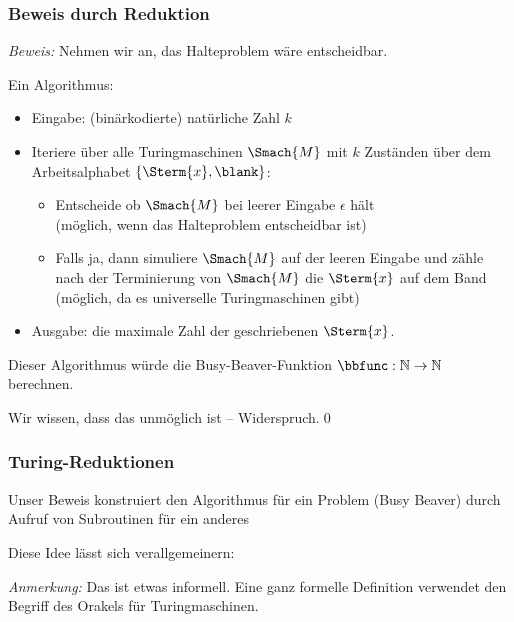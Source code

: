 \documentclass[aspectratio=1610,onlymath]{beamer}
\begin{document}
\begin{frame}[t]\frametitle{Beweis durch Reduktion\phantom{"`T"'}}

\pause

\emph{Beweis:} Nehmen wir an, das Halteproblem wäre entscheidbar.\medskip\pause

Ein Algorithmus:
\begin{itemize}
\item Eingabe: (binärkodierte) natürliche Zahl $k$
\item Iteriere über alle Turingmaschinen $\Smach{M}$ mit $k$ Zuständen über dem Arbeitsalphabet $\{\Sterm{x},\blank\}$:
\begin{itemize}
\item Entscheide ob $\Smach{M}$ bei leerer Eingabe $\epsilon$ hält\\
{\footnotesize\textcolor{devilscss}{(möglich, wenn das Halteproblem entscheidbar ist)}}
\item Falls ja, dann simuliere $\Smach{M}$ auf der leeren Eingabe und zähle
		nach der Terminierung von $\Smach{M}$ die $\Sterm{x}$ auf dem Band\\
{\footnotesize\textcolor{devilscss}{(möglich, da es universelle Turingmaschinen gibt)}}
\end{itemize}
\item Ausgabe: die maximale Zahl der geschriebenen $\Sterm{x}$.
\end{itemize}\pause
Dieser Algorithmus würde die Busy-Beaver-Funktion $\bbfunc:\mathbb{N}\to\mathbb{N}$
berechnen.\medskip

Wir wissen, dass das unmöglich ist -- Widerspruch.\qed

\end{frame}

\begin{frame}\frametitle{Turing-Reduktionen}

Unser Beweis konstruiert den Algorithmus für ein Problem (Busy Beaver)
durch Aufruf von Subroutinen für ein anderes 
\bigskip\pause

Diese Idee lässt sich verallgemeinern:


{\footnotesize
\emph{Anmerkung:} Das ist etwas informell. Eine ganz formelle Definition verwendet den Begriff des \alert{Orakels} für Turingmaschinen.
}\medskip\pause


\end{frame}
\end{document}
